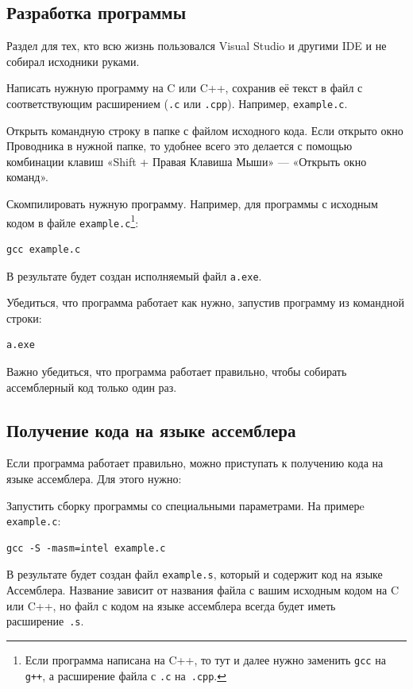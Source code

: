 \documentclass[a4paper,oneside,DIV=12,12pt]{scrartcl}
\newcommand{\allcaps}[1]{%
	{\addfontfeatures{LetterSpace = 5}#1}%
}
\begin{document}
		\subsection{Разработка программы}
			Раздел для тех, кто всю жизнь пользовался Visual Studio и другими \allcaps{IDE} и не собирал исходники руками.
			\begin{steps}
				\item Написать нужную программу на C или C++, сохранив её текст в файл с соответствующим расширением (\verb|.c| или \verb|.cpp|). Например, \texttt{example.c}.
				\item Открыть командную строку в папке с файлом исходного кода. Если открыто окно Проводника в нужной папке, то удобнее всего это делается с помощью комбинации клавиш «Shift + Правая Клавиша Мыши» — «Открыть окно команд».
				\item Скомпилировать нужную программу. Например, для программы с исходным кодом в файле \texttt{example.c}\footnote{Если программа написана на C++, то тут и далее нужно заменить \texttt{gcc} на \texttt{g++}, а расширение файла с \texttt{.c} на~\texttt{.cpp}.}:
					\begin{verbatim}
gcc example.c
					\end{verbatim}
				В результате будет создан исполняемый файл \verb|a.exe|.
				\item Убедиться, что программа работает как нужно, запустив программу из командной строки:
				\begin{verbatim}
a.exe
				\end{verbatim}
			\end{steps}
			Важно убедиться, что программа работает правильно, чтобы собирать ассемблерный код только один раз. 
		
		\subsection{Получение кода на языке ассемблера}
			Если программа работает правильно, можно приступать к получению кода на языке ассемблера. Для этого нужно:
			\begin{steps}
				\item Запустить сборку программы со специальными параметрами. На примерe \verb|example.c|:
				\begin{verbatim}
gcc -S -masm=intel example.c
				\end{verbatim}
			\end{steps}
			В результате будет создан файл \verb|example.s|, который и содержит код на языке Ассемблера. Название зависит от названия файла с вашим исходным кодом на C или C++, но файл с кодом на языке ассемблера всегда будет иметь расширение~\verb|.s|.
			
\end{document}
